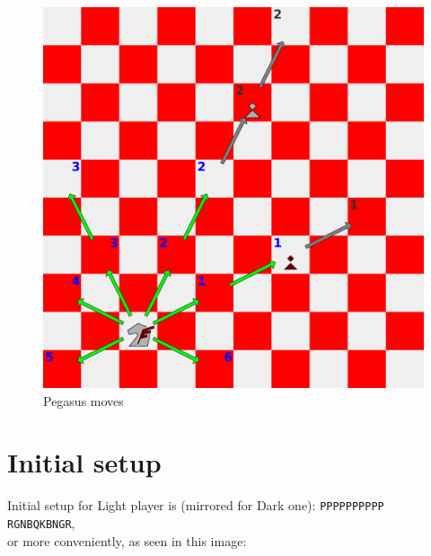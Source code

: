 \documentclass[a5paper,12pt,draft]{book} %
\begin{document}
\noindent
\begin{figure}[!t]
\includegraphics[width=1.0\textwidth, keepaspectratio=true]{../gfx/examples/03_move_pegasus.png}
\caption{Pegasus moves}
\label{fig:pegasus_moves}
\end{figure}

\clearpage

\section*{Initial setup}

Initial setup for Light player is (mirrored for Dark one):
\texttt{PPPPPPPPPP \\
        RGNBQKBNGR}, \\
or more conveniently, as seen in this image:
\end{document}

